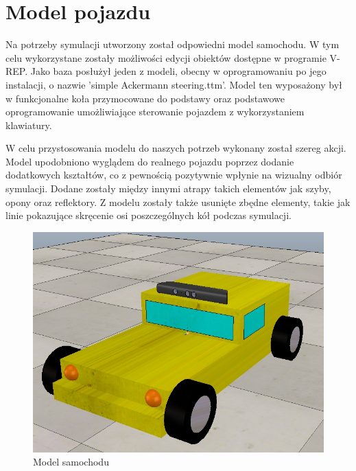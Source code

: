 \newpage
\section{Model pojazdu}
Na potrzeby symulacji utworzony został odpowiedni model samochodu. W tym celu wykorzystane zostały możliwości edycji obiektów dostępne w programie V-REP. Jako baza posłużył jeden z modeli, obecny w oprogramowaniu po jego instalacji, o nazwie 'simple Ackermann steering.ttm'. Model ten wyposażony był w funkcjonalne koła przymocowane do podstawy oraz podstawowe oprogramowanie umożliwiające sterowanie pojazdem z wykorzystaniem klawiatury.

W celu przystosowania modelu do naszych potrzeb wykonany został szereg akcji. Model upodobniono wyglądem do realnego pojazdu poprzez dodanie dodatkowych kształtów, co z pewnością pozytywnie wpłynie na wizualny odbiór symulacji. Dodane zostały między innymi atrapy takich elementów jak szyby, opony oraz reflektory. Z modelu zostały także usunięte zbędne elementy, takie jak linie pokazujące skręcenie osi poszczególnych kół podczas symulacji.

\begin{figure}[!h]
	\centering
	\includegraphics[width=.8\linewidth]{car.jpg}
	\caption{Model samochodu}
	\label{fig:model}
\end{figure}

